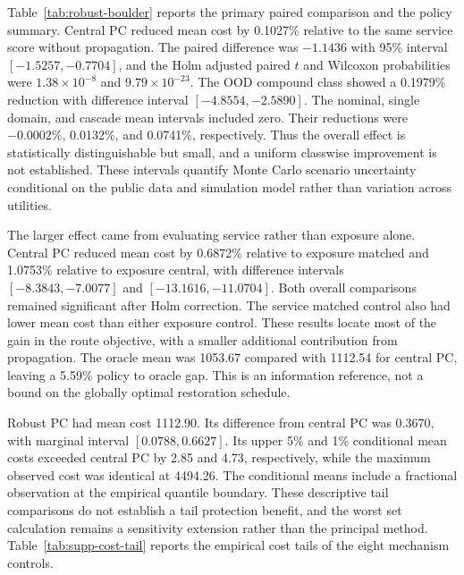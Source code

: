 \documentclass[journal]{IEEEtran}
\begin{document}




Table~\ref{tab:robust-boulder} reports the primary paired comparison and the
policy summary.  Central PC reduced mean cost by 0.1027\% relative to the same
service score without propagation.  The paired difference was $-1.1436$ with
95\% interval $[-1.5257,-0.7704]$, and the Holm adjusted paired $t$ and Wilcoxon
probabilities were $1.38\times10^{-8}$ and $9.79\times10^{-23}$.  The OOD
compound class showed a 0.1979\% reduction with difference interval
$[-4.8554,-2.5890]$.  The nominal, single domain, and cascade mean intervals
included zero.  Their reductions were $-0.0002\%$, 0.0132\%, and 0.0741\%,
respectively.  Thus the overall effect is statistically distinguishable but
small, and a uniform classwise improvement is not established.  These intervals
quantify Monte Carlo scenario uncertainty conditional on the public data and
simulation model rather than variation across utilities.

The larger effect came from evaluating service rather than exposure alone.
Central PC reduced mean cost by 0.6872\% relative to exposure matched and
1.0753\% relative to exposure central, with difference intervals
$[-8.3843,-7.0077]$ and $[-13.1616,-11.0704]$.  Both overall comparisons remained
significant after Holm correction.  The service matched control also had lower
mean cost than either exposure control.  These results locate most of the gain
in the route objective, with a smaller additional contribution from propagation.
The oracle mean was 1053.67 compared with 1112.54 for central PC, leaving a
5.59\% policy to oracle gap.  This is an information reference, not a bound on
the globally optimal restoration schedule.

Robust PC had mean cost 1112.90.  Its difference from central PC was 0.3670,
with marginal interval $[0.0788,0.6627]$.  Its upper 5\% and 1\% conditional
mean costs exceeded central PC by 2.85 and 4.73, respectively, while the maximum
observed cost was identical at 4494.26.  The conditional means include a
fractional observation at the empirical quantile boundary.  These descriptive
tail comparisons do not establish a tail protection benefit, and the worst set
calculation remains a sensitivity extension rather than the principal method.
Table~\ref{tab:supp-cost-tail} reports the empirical cost tails of the eight mechanism controls.


\end{document}
